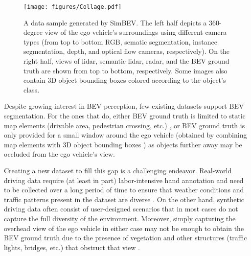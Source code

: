 \begin{figure*}[t]
    \centering
    \texttt{[image: figures/Collage.pdf]}
    \setlength{\abovecaptionskip}{-8 pt}
    \setlength{\belowcaptionskip}{-14 pt}
    \caption{A data sample generated by SimBEV. The left half depicts a 360-degree view of the ego vehicle's surroundings using different camera types (from top to bottom RGB, sematic segmentation, instance segmentation, depth, and optical flow cameras, respectively). On the right half, views of lidar, semantic lidar, radar, and the BEV ground truth are shown from top to bottom, respectively. Some images also contain 3D object bounding boxes colored according to the object's class.}\label{fig:dataset-collage}
\end{figure*}

Despite growing interest in BEV perception, few existing datasets support BEV segmentation. For the ones that do, either BEV ground truth is limited to static map elements (drivable area, pedestrian crossing, etc.) \cite{caesar2020nuscenes}, or BEV ground truth is only provided for a small window around the ego vehicle (obtained by combining map elements with 3D object bounding boxes \cite{houston2021one}) as objects further away may be occluded from the ego vehicle's view.

Creating a new dataset to fill this gap is a challenging endeavor. Real-world driving data require (at least in part) labor-intensive hand annotation and need to be collected over a long period of time to ensure that weather conditions and traffic patterns present in the dataset are diverse \cite{uricar2019challenges, liu2024survey}. On the other hand, synthetic driving data often consist of user-designed scenarios that in most cases do not capture the full diversity of the environment. Moreover, simply capturing the overhead view of the ego vehicle in either case may not be enough to obtain the BEV ground truth due to the presence of vegetation and other structures (traffic lights, bridges, etc.) that obstruct that view \cite{liu2025h}.

